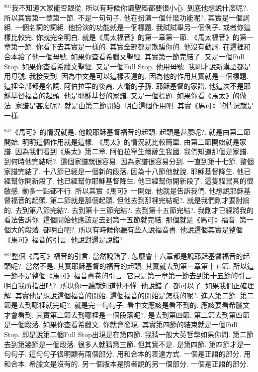 \documentclass{book}
\begin{document}
$^{801}$我不知道大家能否跟從.
所以有時候你讀聖經都要很小心.
到底他想說什麼呢?.
所以其實第一章第一節.
不是一句句子.
他在扮演一個什麼功能呢?.
其實是一個詞組.
一個名詞的詞組.
他扮演的功能就是一個標題.
我試試舉另一個例子.
或者你這樣比較完.
你就完全明白.
就是《馬太福音》的第一章第一節.
《馬太福音》的第一章第一節.
你看下去其實是一樣的.
其實全部都是欺騙你的.
他沒有動詞.
在這裡和合本給了他一個母號.
如果你查看希臘文聖經.
其實第一節完結了.
又是一個Full Stop.
如果你查看希臘文聖經.
又是一個Full Stop.
他用母號.
我剛才說新漢語都是用母號.
我接受到.
因為中文是可以這樣表達的.
因為他的作用其實就是一個標題.
這裡全部都是名詞.
阿伯拉罕的後裔.
大衛的子孫.
耶穌基督的家譜.
他這次不是耶穌基督福音的起頭.
他是耶穌基督的家譜.
又是一個標題.
如果你看《馬太》的做法.
家譜是甚麼呢?.
就是由第二節開始.
明白這個作用吧.
其實《馬可》的情況就是一樣.

$^{841}$《馬可》的情況就是.
他說耶穌基督福音的起頭.
起頭是甚麼呢?.
就是由第二節開始.
明明這個作用就是這樣.
《馬太》的情況就比較簡單.
由第二節開始就是家譜.
因為我們看到《馬太》第二章.
阿伯拉罕生爾薩生我國.
我們知道那個是家譜.
到何時他完結呢?.
這個家譜就很容易.
因為家譜很容易分到.
一直到第十七節.
整個家譜完結了.
十八節已經是一個新的段落.
因為十八節他就說.
耶穌基督降生.
他已經幫你開新段了.
他已經幫你耶穌基督降生.
他已經幫你開新段了.
這隻貓鼠真的很敏感.
動多一點都不行.
所以其實《馬可》一開始.
他就是告訴我們.
他想說耶穌基督福音的起頭.
第二節就是那個起頭.
但他去到那裡完結呢?.
就是我們剛才要討論的.
去到第八節完結?.
去到第十三節完結?.
去到第十五節完結?.
我剛才已經將我的看法告訴你.
這個開始他應該是去到第十五節就完結.
那個就是《馬可》福音.
第一個大的段落.
都明白吧?.
所以有時候你聽有些人說福音書.
他說這個其實是整個《馬可》福音的引言.
他說對還是說錯?.

$^{881}$整個《馬可》福音的引言.
當然說錯了.
怎麼會十六章都是說耶穌基督福音的起頭呢?.
當然不是.
其實耶穌基督的福音的起頭.
其實就去到第一章第十五節.
所以這一節不是整個《馬可》福音書卷的引言.
它只是第一章第一節去到第十五節的引言.
明白我所指出吧?.
所以你一聽就知道他不懂.
他說錯了.
都可以了.
如果我們正確理解.
其實他是想說這個福音的開始.
這個福音的開始是怎樣的呢?.
進入第二節.
第二節是去到哪裡就完呢?.
就是完一句句子.
看中文應該是看不到的.
應該要看希臘文才會看到.
其實第二節去到哪裡是一個段落呢?.
是去到第四節.
第二節去到第四節是一個段落.
如果你查看希臘文.
你就會發現.
其實第四節的結束就是一個Full Stop.
即是說第二個Full Stop出現是在第四節.
我猜一般大英哲學如果你問.
第二節去到第幾節是一個段落.
很多人就猜第三節.
但其實不是.
是第四節.
第四節才是一句句子.
這句句子很明顯有兩個部分.
用和合本的表達方式.
一個是正語的部分.
用和合本.
希臘文是沒有的.
另一個版本是照者說的另一個部分.
一個是正語的部分.
\end{document}
